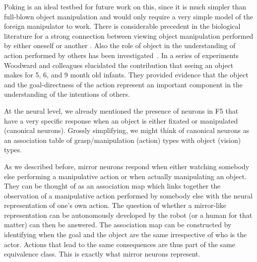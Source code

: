 \ifverbose
Poking is an ideal testbed for future work on this, since it is much
simpler than full-blown object manipulation and would only require a
very simple model of the foreign manipulator to work.
There is considerable precedent in the biological literature for a
strong connection between viewing object manipulation performed by
either oneself or another \cite{wohlsclager02human}. Also
the role of object in the understanding of action performed by others
has been investigated~\cite{woodward98infants}. In a series of
experiments Woodward and colleagues elucidated the contribution that
seeing an object makes for 5, 6, and 9 month old infants. They
provided evidence that the object and the goal-directness of the
action represent an important component in the understanding of the
intentions of others.
\fi

\ifverbose
At the neural level, we already mentioned the presence of neurons in
F5 that have a very specific response when an object is either fixated
or manipulated (canonical neurons). Grossly simplifying, we might
think of canonical neurons as an association table of
grasp/manipulation (action) types with object (vision) types.
\fi

As we described before, mirror neurons respond when either watching 
somebody else performing a manipulative action or when actually 
manipulating an object. They can be thought of as an 
association map which links together the observation of a manipulative 
action performed by somebody else with the neural representation of one's 
own action. The question of whether a mirror-like representation can be
autonomously developed by the robot (or a human for that matter) can
then be answered. The association map can be constructed by
identifying when the goal and the object are the same irrespective of
who is the actor. Actions that lead to the same consequences are thus
part of the same equivalence class.  This is exactly what mirror neurons
represent.

